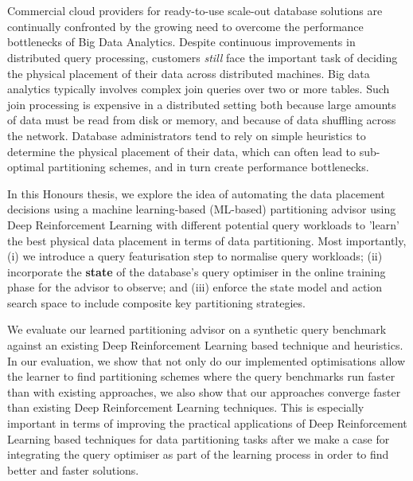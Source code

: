 \chapter*{}
Commercial cloud providers for ready-to-use scale-out database solutions are continually confronted by the growing need to overcome the performance bottlenecks of Big Data Analytics. Despite continuous improvements in distributed query processing, customers \textit{still} face the important task of deciding the physical placement of their data across distributed machines. Big data analytics typically involves complex join queries over two or more tables. Such join processing is expensive in a distributed setting both because large amounts of data must be read from disk or memory, and because of data shuffling across the network. Database administrators tend to rely on simple heuristics to determine the physical placement of their data, which can often lead to sub-optimal partitioning schemes, and in turn create performance bottlenecks.

In this Honours thesis, we explore the idea of automating the data placement decisions using a machine learning-based (ML-based) partitioning advisor using Deep Reinforcement Learning with different potential query workloads to 'learn' the best physical data placement in terms of data partitioning. Most importantly, (i) we introduce a query featurisation step to normalise query workloads; (ii) incorporate the \textbf{state} of the database's query optimiser in the online training phase for the advisor to observe; and (iii) enforce the state model and action search space to include composite key partitioning strategies.

We evaluate our learned partitioning advisor on a synthetic query benchmark against an existing Deep Reinforcement Learning based technique and heuristics. In our evaluation, we show that not only do our implemented optimisations allow the learner to find partitioning schemes where the query benchmarks run faster than with existing approaches, we also show that our approaches converge faster than existing Deep Reinforcement Learning techniques. This is especially important in terms of improving the practical applications of Deep Reinforcement Learning based techniques for data partitioning tasks after we make a case for integrating the query optimiser as part of the learning process in order to find better and faster solutions.

